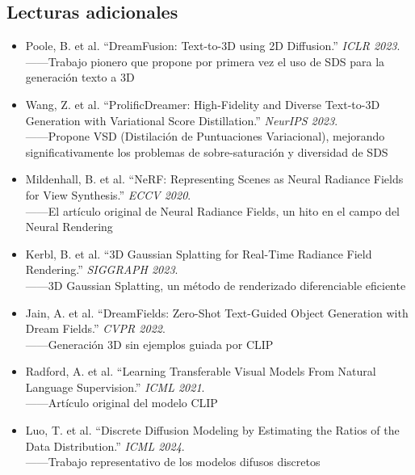 \subsection{Lecturas adicionales}

\begin{itemize}
    \item Poole, B. et al. ``DreamFusion: Text-to-3D using 2D Diffusion.'' \textit{ICLR 2023}. \\
    ——Trabajo pionero que propone por primera vez el uso de SDS para la generación texto a 3D

    \item Wang, Z. et al. ``ProlificDreamer: High-Fidelity and Diverse Text-to-3D Generation with Variational Score Distillation.'' \textit{NeurIPS 2023}. \\
    ——Propone VSD (Distilación de Puntuaciones Variacional), mejorando significativamente los problemas de sobre-saturación y diversidad de SDS

    \item Mildenhall, B. et al. ``NeRF: Representing Scenes as Neural Radiance Fields for View Synthesis.'' \textit{ECCV 2020}. \\
    ——El artículo original de Neural Radiance Fields, un hito en el campo del Neural Rendering

    \item Kerbl, B. et al. ``3D Gaussian Splatting for Real-Time Radiance Field Rendering.'' \textit{SIGGRAPH 2023}. \\
    ——3D Gaussian Splatting, un método de renderizado diferenciable eficiente

    \item Jain, A. et al. ``DreamFields: Zero-Shot Text-Guided Object Generation with Dream Fields.'' \textit{CVPR 2022}. \\
    ——Generación 3D sin ejemplos guiada por CLIP

    \item Radford, A. et al. ``Learning Transferable Visual Models From Natural Language Supervision.'' \textit{ICML 2021}. \\
    ——Artículo original del modelo CLIP

    \item Luo, T. et al. ``Discrete Diffusion Modeling by Estimating the Ratios of the Data Distribution.'' \textit{ICML 2024}. \\
    ——Trabajo representativo de los modelos difusos discretos
\end{itemize}



